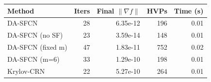 \begin{tabular}{@{}lrrrr@{}}
\toprule
Method & Iters & Final $\|\nabla f\|$ & HVPs & Time (s) \\
\midrule
DA-SFCN & 28 & 6.35e-12 & 196 & 0.01 \\
DA-SFCN (no SF) & 23 & 3.59e-14 & 148 & 0.01 \\
DA-SFCN (fixed m) & 47 & 1.83e-11 & 752 & 0.02 \\
DA-SFCN (m=6) & 33 & 1.29e-10 & 198 & 0.01 \\
Krylov-CRN & 22 & 5.27e-10 & 264 & 0.01 \\
\bottomrule
\end{tabular}